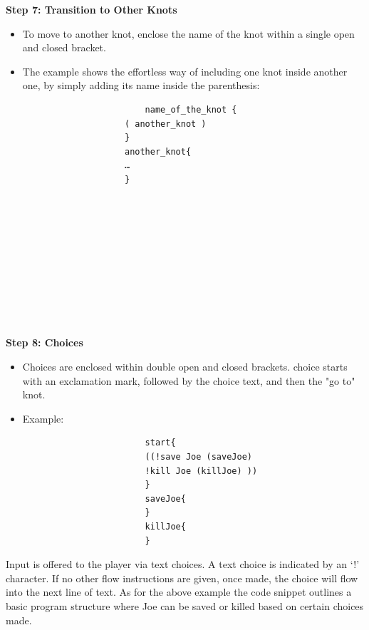    \noindent \textbf{Step 7: Transition to Other Knots}
 \begin{itemize}
                \item To move to another knot, enclose the name of the knot within a single open and closed bracket.
                \item The example shows the effortless way of including one knot inside another one, by simply adding its name inside the parenthesis: \begin{verbatim}
                        name_of_the_knot {
                    ( another_knot )
                    }
                    another_knot{
                    …
                    }                 









                    
                      \end{verbatim}
                   
 \end{itemize}
 
   \noindent \textbf{Step 8:  Choices}
 \begin{itemize}
                \item Choices are enclosed within double open and closed brackets.
                \itemEach choice starts with an exclamation mark, followed by the choice text, and then the "go to" knot.
                \item Example: \begin{verbatim}
                        start{
                        ((!save Joe (saveJoe)
                        !kill Joe (killJoe) ))
                        }
                        saveJoe{
                        }
                        killJoe{
                        }
                      \end{verbatim}
 \end{itemize}

 \noindent Input is offered to the player via text choices. A text choice is indicated by an ‘!’ character. If no other flow instructions are given, once made, the choice will flow into the next line of text. As for the above example the code snippet outlines a basic program structure where Joe can be saved or killed based on certain choices made.

